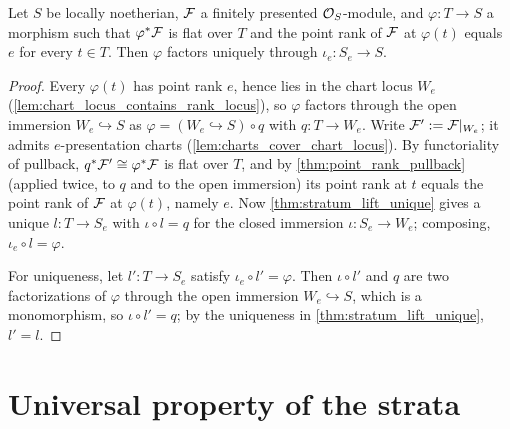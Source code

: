 \begin{theorem}
  \label{thm:factor_rank_stratum_unique}
  \leanok
  Let \(S\) be locally noetherian, \(\mathcal{F}\) a finitely presented
  \(\mathcal{O}_S\)-module, and \(\varphi : T \to S\) a morphism such that
  \(\varphi^*\mathcal{F}\) is flat over \(T\) and the point rank of \(\mathcal{F}\) at
  \(\varphi(t)\) equals \(e\) for every \(t \in T\).  Then \(\varphi\)
  factors uniquely through \(\iota_e : S_e \to S\).
\end{theorem}

\begin{proof}
  \leanok
  Every \(\varphi(t)\) has point rank \(e\), hence lies in the chart locus
  \(W_e\) (\cref{lem:chart_locus_contains_rank_locus}), so \(\varphi\)
  factors through the open immersion \(W_e \hookrightarrow S\) as
  \(\varphi = (W_e \hookrightarrow S) \circ q\) with \(q : T \to W_e\).
  Write \(\mathcal{F}' := \mathcal{F}|_{W_e}\); it admits \(e\)-presentation charts
  (\cref{lem:charts_cover_chart_locus}).  By functoriality of pullback,
  \(q^*\mathcal{F}' \cong \varphi^*\mathcal{F}\) is flat over \(T\), and by
  \cref{thm:point_rank_pullback} (applied twice, to \(q\) and to the open
  immersion) its point rank at \(t\) equals the point rank of \(\mathcal{F}\) at
  \(\varphi(t)\), namely \(e\).  Now \cref{thm:stratum_lift_unique} gives a
  unique \(l : T \to S_e\) with \(\iota \circ l = q\) for the closed
  immersion \(\iota : S_e \to W_e\); composing,
  \(\iota_e \circ l = \varphi\).

  For uniqueness, let \(l' : T \to S_e\) satisfy
  \(\iota_e \circ l' = \varphi\).  Then \(\iota \circ l'\) and \(q\) are two
  factorizations of \(\varphi\) through the open immersion
  \(W_e \hookrightarrow S\), which is a monomorphism, so
  \(\iota \circ l' = q\); by the uniqueness in
  \cref{thm:stratum_lift_unique}, \(l' = l\).
\end{proof}

\section{Universal property of the strata}
\label{sec:flatstrat_universal}

